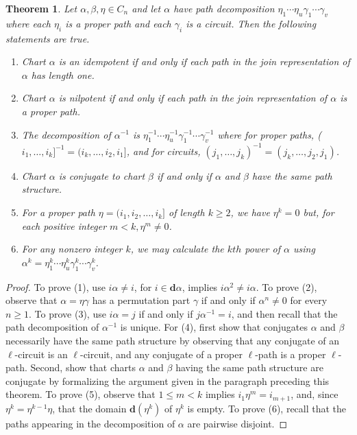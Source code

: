 \documentclass{surv-l}
\numberwithin{equation}{section}
\numberwithin{table}{section}
\numberwithin{figure}{section}
\newtheorem{theorem}[equation]{Theorem}
\theoremstyle{definition}
\begin{document}
\begin{theorem}\label{thm2.5.1}
Let $\alpha,\beta,\eta\in C_{n}$ and let $\alpha$ have path
decomposition $\eta_{1}\cdots\eta_{u}\gamma_{1}\cdots\gamma_{v}$
where each $\eta_{i}$ is a proper path and each $\gamma_{i}$ is a
circuit. Then the following statements are true.
\begin{enumerate}
\item[(1)] Chart $\alpha$ is an idempotent if and only if
each path in the join representation of $\alpha$ has length
one.

\item[(2)] Chart $\alpha$ is nilpotent if and only if each
path in the join representation of $\alpha$ is a proper path.

\item[(3)] The decomposition of $\alpha^{-1}$ is
$\eta_{1}^{-1}\cdots\eta_{u}^{-1}\gamma_{1}^{-1}\cdots\gamma_{v}^{-1}$
where for proper paths,
($i_{1},\ldots,i_{k}]^{-1}=(i_{k},\ldots, i_{2},i_{1}]$, and
for circuits, $(j_{1},\ldots,
j_{k})^{-1}=(j_{k},\ldots,j_{2},j_{1})$.

\item[(4)] Chart $\alpha$ is conjugate to chart $\beta$
if and only if $\alpha$ and $\beta$ have the same path
structure.

\item[(5)] For a proper path $\eta=(i_{1}, i_{2},\ldots, i_{k}]$
of length $k\geq 2$, we have $\eta^{k}=0$ but, for each
positive integer $m<k,\eta^{m}\neq 0$.

\item[(6)] For any nonzero integer $k$, we may calculate the
$kth$ power of $\alpha$ using
$\alpha^{k}=\eta_{1}^{k}\cdots\eta_{u}^{k}\gamma_{1}^{k}\cdots\gamma_{v}^{k}$.
\end{enumerate}
\end{theorem}

\begin{proof} To prove (1), use $i\alpha\neq i$, for $i\in
\mathbf{d}\alpha$, implies $ i\alpha^{2}\neq i\alpha$. To prove
(2), observe that $\alpha=\eta\gamma$ has a permutation part
$\gamma$ if and only if $\alpha^{n}\neq 0$ for every $n\geq 1$. To
prove (3), use $i\alpha=j$ if and only if $j\alpha^{-1}=i$, and
then recall that the path decomposition of $\alpha^{-1}$ is
unique. For (4), first show that conjugates $\alpha$ and $\beta$
necessarily have the same path structure by observing that any
conjugate of an $\ell$-circuit is an $\ell$-circuit, and any
conjugate of a proper $\ell$-path is a proper $\ell$-path. Second,
show that charts $\alpha$ and $\beta$ having the
same path structure are conjugate by formalizing the argument
given in the paragraph preceding this theorem. To prove (5),
observe that $1\leq m<k$ implies $i_{1}\eta^{m}=i_{m+1}$, and,
since $\eta^{k}=\eta^{k-1}\eta$, that the domain
$\mathbf{d}(\eta^{k})$ of $\eta^{k}$ is empty. To prove (6),
recall that the paths appearing in the decomposition of $\alpha$
are pairwise disjoint.
\end{proof}
\end{document}
